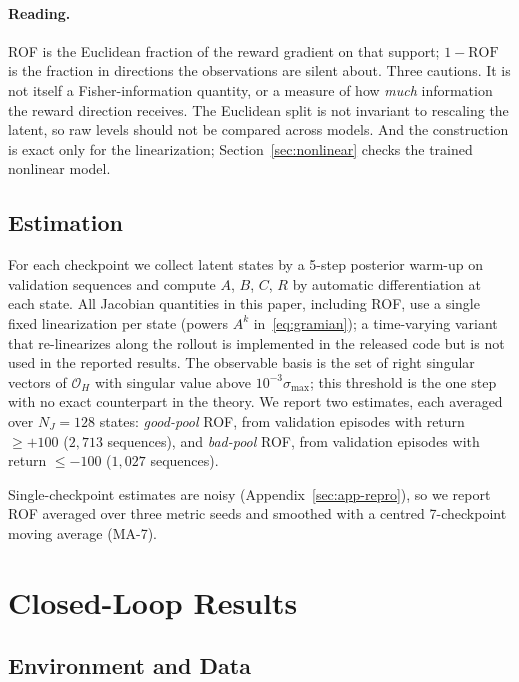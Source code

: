 \documentclass[11pt]{article}
\newcommand{\ROF}{\mathrm{ROF}}
\theoremstyle{remark}
\begin{document}
\paragraph{Reading.}
ROF is the Euclidean fraction of the reward gradient on that support; $1-\ROF$ is the fraction in directions the observations are silent about. Three cautions. It is not itself a Fisher-information quantity, or a measure of how \emph{much} information the reward direction receives. The Euclidean split is not invariant to rescaling the latent, so raw levels should not be compared across models. And the construction is exact only for the linearization; Section~\ref{sec:nonlinear} checks the trained nonlinear model.

\subsection{Estimation}
\label{sec:estimation}

For each checkpoint we collect latent states by a 5-step posterior warm-up on validation sequences and compute $A$, $B$, $C$, $R$ by automatic differentiation at each state. All Jacobian quantities in this paper, including ROF, use a single fixed linearization per state (powers $A^k$ in~\eqref{eq:gramian}); a time-varying variant that re-linearizes along the rollout is implemented in the released code but is not used in the reported results. The observable basis is the set of right singular vectors of $\mathcal{O}_H$ with singular value above $10^{-3}\sigma_{\max}$; this threshold is the one step with no exact counterpart in the theory. We report two estimates, each averaged over $N_J{=}128$ states: \emph{good-pool} ROF, from validation episodes with return $\ge +100$ ($2{,}713$ sequences), and \emph{bad-pool} ROF, from validation episodes with return $\le -100$ ($1{,}027$ sequences).

Single-checkpoint estimates are noisy (Appendix~\ref{sec:app-repro}), so we report ROF averaged over three metric seeds and smoothed with a centred 7-checkpoint moving average (MA-7).

\section{Closed-Loop Results}
\label{sec:closed-loop}

\subsection{Environment and Data}
\label{sec:data}
\end{document}

